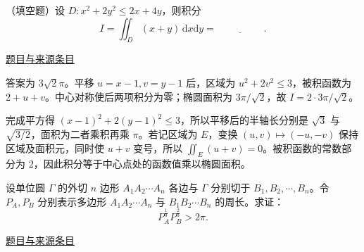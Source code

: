 \documentclass[UTF8,12pt,a4paper,fontset=fandol]{ctexart}
\begin{document}
\begin{example}[来源序号3]\label{ex:fin07-hi:3}\label{pr:fin07-hi:3}

（填空题）设 $D:x^{2}+2y^{2}\leq 2x+4y$，则积分
\[
I=\iint_{D}(x+y)\,\mathrm{d}x\mathrm{d}y=\underline{\hspace{2cm}}.
\]

\par\href{https://github.com/lzxcr/cmc-mathematics/blob/64916fa1fdbc3e444a652eca204d5669058ee321/src/problems/finals/07/03.md}{题目与来源条目}

\end{example}

\begin{solve}\label{ans:fin07-hi:3}

答案为 $3\sqrt2\pi$。平移 $u=x-1,v=y-1$ 后，区域为 $u^2+2v^2\leq3$，被积函数为 $2+u+v$。中心对称使后两项积分为零；椭圆面积为 $3\pi/\sqrt2$，故 $I=2\cdot3\pi/\sqrt2$。

完成平方得 $(x-1)^2+2(y-1)^2\le3$，所以平移后的半轴长分别是 $\sqrt3$ 与 $\sqrt{3/2}$，面积为二者乘积再乘 $\pi$。若记区域为 $E$，变换 $(u,v)\mapsto(-u,-v)$ 保持区域及面积元，同时使 $u+v$ 变号，所以 $\iint_E(u+v)=0$。被积函数的常数部分为 $2$，因此积分等于中心点处的函数值乘以椭圆面积。

\end{solve}

\begin{example}[来源序号7]\label{ex:fin07-hi:7}\label{pr:fin07-hi:7}

设单位圆 $\Gamma$ 的外切 $n$ 边形 $A_{1}A_{2}\cdots A_{n}$ 各边与 $\Gamma$ 分别切于 $B_{1},B_{2},\cdots,B_{n}$。令 $P_{A},P_{B}$ 分别表示多边形 $A_{1}A_{2}\cdots A_{n}$ 与 $B_{1}B_{2}\cdots B_{n}$ 的周长。求证：
\[
P_{A}^{\frac{1}{3}}P_{B}^{\frac{2}{3}}>2\pi.
\]

\par\href{https://github.com/lzxcr/cmc-mathematics/blob/64916fa1fdbc3e444a652eca204d5669058ee321/src/problems/finals/07/07.md}{题目与来源条目}

\end{example}
\end{document}
